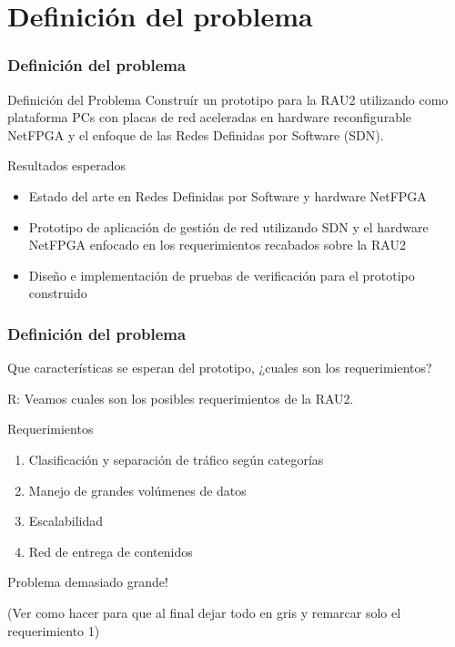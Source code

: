 \documentclass{beamer}
\begin{document}
\section{Definición del problema} 


\begin{frame}
\frametitle{Definición del problema} 

\begin{block}{Definición del Problema }
Constru\'ir un prototipo para la RAU2 utilizando como plataforma PCs con placas de red aceleradas en hardware reconfigurable NetFPGA y el enfoque de las Redes Definidas por Software (SDN).
\end{block}

\begin{block}{Resultados esperados}
\begin{itemize}
\item Estado del arte en Redes Definidas por Software y hardware NetFPGA
\item Prototipo de aplicaci\'on de gesti\'on de red utilizando SDN y el hardware NetFPGA enfocado en los requerimientos recabados sobre la RAU2
\item Diseño e implementaci\'on de pruebas de verificaci\'on para el prototipo construido
\end{itemize}
\end{block}

\end{frame}

\begin{frame}
\frametitle{Definición del problema} 

Que características se esperan del prototipo, ¿cuales son los requerimientos?

\pause
R: Veamos cuales son los posibles requerimientos de la RAU2.

\pause
\begin{block}{Requerimientos}
\begin{enumerate}[<+->]
\item Clasificaci\'on y separaci\'on de tr\'afico seg\'un categorías
\item Manejo de grandes vol\'umenes de datos
\item Escalabilidad
\item Red de entrega de contenidos
\end{enumerate}
\end{block}

\pause
Problema demasiado grande!

(Ver como hacer para que al final dejar todo en gris y remarcar solo el requerimiento 1)
\end{frame}
\end{document}

